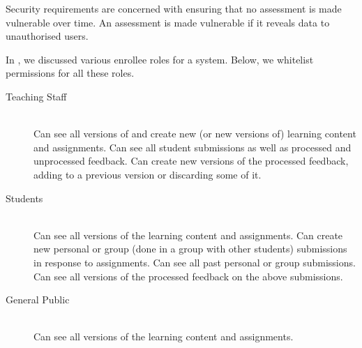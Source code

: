 Security requirements are concerned with ensuring that no assessment is made
vulnerable over time. An assessment is made vulnerable if it reveals data to
unauthorised users.

In , we discussed various
enrollee roles for a system.  Below, we whitelist permissions for all these
roles.

\begin{description}

\item[Teaching Staff] \ \\ Can see all versions of and create new (or new
versions of) learning content and assignments.  Can see all student submissions
as well as processed and unprocessed feedback. Can create new versions of the
processed feedback, adding to a previous version or discarding some of it.

\item[Students] \ \\ Can see all versions of the learning content and
assignments.  Can create new personal or group (done in a group with other
students) submissions in response to assignments. Can see all past personal or
group submissions.  Can see all versions of the processed feedback on the above
submissions.

\item[General Public] \ \\ Can see all versions of the learning content and
assignments.

\end{description}
